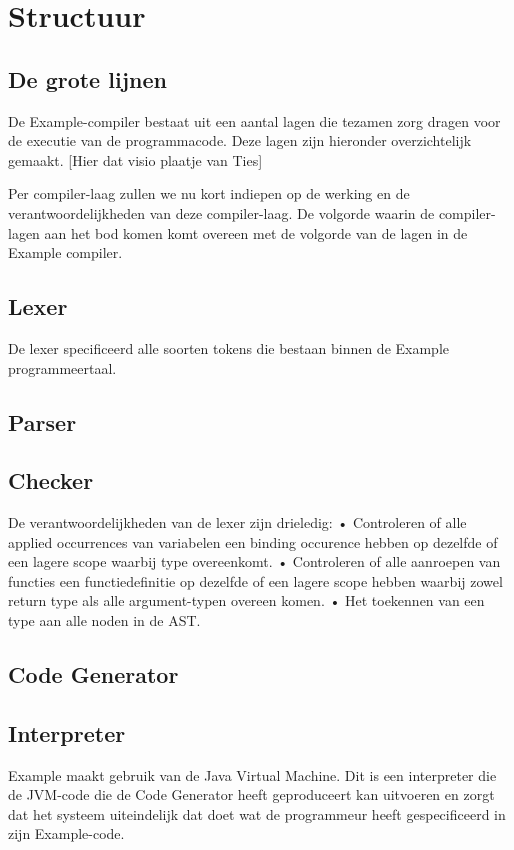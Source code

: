 \chapter{Structuur}
\section{De grote lijnen}
De Example-compiler bestaat uit een aantal lagen die tezamen zorg dragen voor de executie van de programmacode. Deze lagen zijn hieronder overzichtelijk gemaakt. 
[Hier dat visio plaatje van Ties]

Per compiler-laag zullen we nu kort indiepen op de werking en de verantwoordelijkheden van deze compiler-laag. De volgorde waarin de compiler-lagen aan het bod komen komt overeen met de volgorde van de lagen in de Example compiler. 

\section{Lexer}
De lexer specificeerd alle soorten tokens die bestaan binnen de Example programmeertaal.
\section{Parser}
\section{Checker}
De verantwoordelijkheden van de lexer zijn drieledig:
• Controleren of alle applied occurrences van variabelen een binding occurence hebben op dezelfde of een lagere scope waarbij type overeenkomt.
• Controleren of alle aanroepen van functies een functiedefinitie op dezelfde of een lagere scope hebben waarbij zowel return type als alle argument-typen overeen komen.
• Het toekennen van een type aan alle noden in de AST.
\section{Code Generator}
\section{Interpreter}
Example maakt gebruik van de Java Virtual Machine. Dit is een interpreter die de JVM-code die de Code Generator heeft geproduceert kan uitvoeren en zorgt dat het systeem uiteindelijk dat doet wat de programmeur heeft gespecificeerd in zijn Example-code. 
